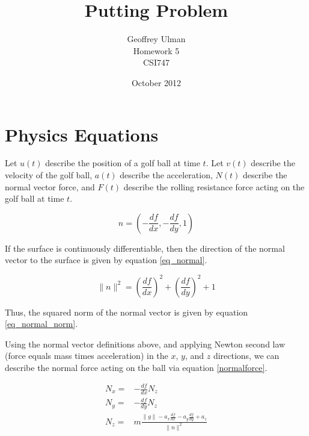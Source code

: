 \documentclass{article}
\begin{document}
\title{Putting Problem}
\author{Geoffrey Ulman\\
        Homework 5\\
        CSI747}
\date{October 2012}
\maketitle

\section{Physics Equations}\label{Physics Equations}

Let \(u(t)\) describe the position of a golf ball at time \(t\). Let \(v(t)\) describe the velocity of the golf ball, \(a(t)\) describe the acceleration, \(N(t)\) describe the normal vector force, and \(F(t)\) describe the rolling resistance force acting on the golf ball at time \(t\).

\begin{equation}\label{eq_normal}
n = \left( -\frac{df}{dx},-\frac{df}{dy}, 1 \right)
\end{equation}

If the surface is continuously differentiable, then the direction of the normal vector to the surface is given by equation \ref{eq_normal}.

\begin{equation}\label{eq_normal_norm}
\|n\|^2 = \left( \frac{df}{dx} \right)^2 + \left( \frac{df}{dy} \right)^2 + 1
\end{equation}

Thus, the squared norm of the normal vector is given by equation \ref{eq_normal_norm}.

Using the normal vector definitions above, and applying Newton second law (force equals mass times acceleration) in the \(x\), \(y\), and \(z\) directions, we can describe the normal force acting on the ball via equation \ref{normalforce}.

\begin{eqnarray}\label{normalforce}
N_x = &- \frac{df}{dx} N_z \nonumber \\
N_y = &- \frac{df}{dy} N_z \nonumber \\
N_z = &m \frac{  \|g\| - a_x \frac{df}{dx} - a_y \frac{df}{dy}  +a_z  }{\|n\|^2}
\end{eqnarray}
\end{document}
